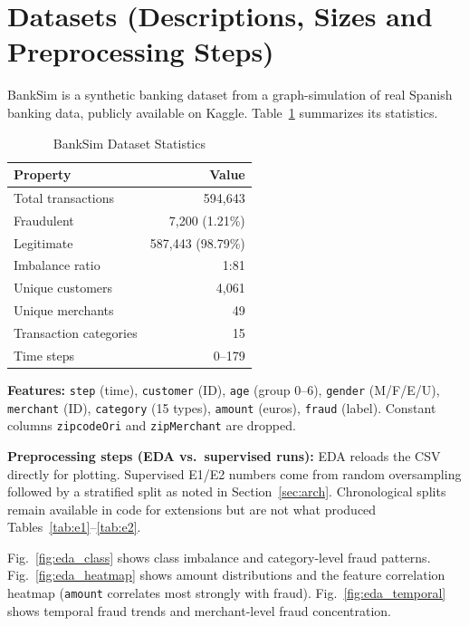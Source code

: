 \documentclass[conference]{IEEEtran}
\begin{document}
\section{Datasets (Descriptions, Sizes and Preprocessing Steps)}

BankSim \cite{b1} is a synthetic banking dataset from a graph-simulation of real Spanish banking data, publicly available on Kaggle. Table~\ref{tab:dataset} summarizes its statistics.

\begin{table}[H]
\centering
\caption{BankSim Dataset Statistics}
\label{tab:dataset}
\begin{tabular}{@{}lr@{}}
\toprule
\textbf{Property} & \textbf{Value} \\
\midrule
Total transactions      & 594{,}643 \\
Fraudulent              & 7{,}200 (1.21\%) \\
Legitimate              & 587{,}443 (98.79\%) \\
Imbalance ratio         & 1:81 \\
Unique customers        & 4{,}061 \\
Unique merchants        & 49 \\
Transaction categories  & 15 \\
Time steps              & 0--179 \\
\bottomrule
\end{tabular}
\end{table}

\textbf{Features:} \texttt{step} (time), \texttt{customer} (ID), \texttt{age} (group 0--6), \texttt{gender} (M/F/E/U), \texttt{merchant} (ID), \texttt{category} (15 types), \texttt{amount} (euros), \texttt{fraud} (label). Constant columns \texttt{zipcodeOri} and \texttt{zipMerchant} are dropped.

\textbf{Preprocessing steps (EDA vs.\ supervised runs):} EDA reloads the CSV directly for plotting. Supervised E1/E2 numbers come from random oversampling followed by a stratified split as noted in Section~\ref{sec:arch}. Chronological splits remain available in code for extensions but are not what produced Tables~\ref{tab:e1}--\ref{tab:e2}.

Fig.~\ref{fig:eda_class} shows class imbalance and category-level fraud patterns. Fig.~\ref{fig:eda_heatmap} shows amount distributions and the feature correlation heatmap (\texttt{amount} correlates most strongly with fraud). Fig.~\ref{fig:eda_temporal} shows temporal fraud trends and merchant-level fraud concentration.
\end{document}
